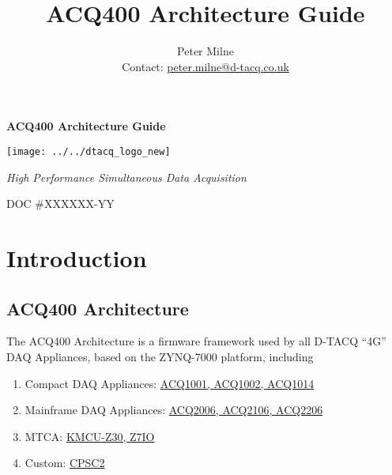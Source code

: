 \documentclass[]{article}
\newcommand{\mytitle}{ACQ400 Architecture Guide}
\begin{document}
\title{ACQ400 Architecture Guide}
\author{Peter Milne \\ Contact: \href{mailto:peter.milne@d-tacq.co.uk}{peter.milne@d-tacq.co.uk} }

\thispagestyle{empty} %
\begin{center}\huge{\textbf{\mytitle}}\end{center}
\vspace{2.5cm}
\begin{center}
	\texttt{[image: ../../dtacq\_logo\_new]}
\end{center}
\begin{center}\textcolor{dtacqblue}{\large{\textit{High Performance Simultaneous Data Acquisition}}}\end{center}
\vspace{5cm}
\begin{center}\large{DOC \#XXXXXX-YY}\end{center}


\begin{versionhistory}
\end{versionhistory}
\setcounter{table}{0} %

\pagebreak

\tableofcontents


\section{Introduction}

\subsection{ACQ400 Architecture}

The ACQ400 Architecture is a firmware framework used by all D-TACQ “4G” DAQ Appliances, based on the ZYNQ-7000 platform, including
\begin{enumerate}
	\item Compact DAQ Appliances: \href{http://www.d-tacq.com/resources/d-tacq-4G-acq4xx-UserGuide-r28.pdf}{ACQ1001, ACQ1002, ACQ1014}
	\item Mainframe DAQ Appliances: \href{http://www.d-tacq.com/resources/Bolo_calibration_report_user-guide.pdf}{ACQ2006, ACQ2106, ACQ2206}
	\item MTCA:  \href{https://github.com/seanalsop/bolodsp-doc/releases}{KMCU-Z30, Z7IO}
	\item Custom: \href{https://github.com/seanalsop/bolodsp-doc/releases}{CPSC2}
\end{enumerate}
\end{document}
